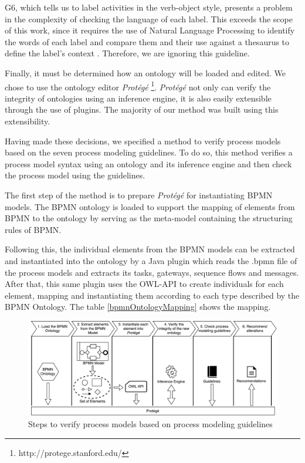 \documentclass[a4paper,twoside]{article}
\begin{document}
G6, which tells us to label activities in the verb-object style, presents a problem in the complexity of checking the language of each label. This exceeds the scope of this work, since it requires the use of Natural Language Processing to identify the words of each label and compare them and their use against a thesaurus to define the label's context \cite{Gassen2014}. Therefore, we are ignoring this guideline.



Finally, it must be determined how an ontology will be loaded and edited. We chose to use the ontology editor \textit{Protégé} \footnote{http://protege.stanford.edu/}. \textit{Protégé} not only can verify the integrity of ontologies using an inference engine, it is also easily extensible through the use of plugins. The majority of our method was built using this extensibility. %

\noindent Having made these decisions, we specified a method to verify process models based on the seven process modeling guidelines. To do so, this method verifies a process model syntax using an ontology and its inference engine and then check the process model using the guidelines.

The first step of the method is to prepare \textit{Protégé} for instantiating BPMN models. The BPMN ontology is loaded to support the mapping of elements from BPMN to the ontology by serving as the meta-model containing the structuring rules of BPMN.

Following this, the individual elements from the BPMN models can be extracted and instantiated into the ontology by a Java plugin which reads the .bpmn file of the process models and extracts its tasks, gateways, sequence flows and messages. After that, this same plugin uses the OWL-API to create individuals for each element, mapping and instantiating them according to each type described by the BPMN Ontology. The table \ref{bpmnOntologyMapping} shows the mapping.

\begin{figure}
	\includegraphics[width=\textwidth ]{method.pdf}
	\caption{Steps to verify process models based on process modeling guidelines}
	\label{methodFigure}
\end{figure}
\end{document}
